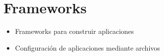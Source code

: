 \section{ Frameworks }

\begin{itemize}
	\item Frameworks para construir aplicaciones
	\item Configuración de aplicaciones mediante archivos
\end{itemize}




